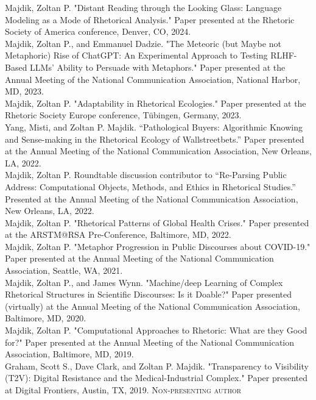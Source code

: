 \documentclass[10pt, a4paper]{article}
\newcommand{\years}[1]{\marginnote{\scriptsize #1}}
\begin{document}
\noindent
\years{2024}Majdik, Zoltan P. "Distant Reading through the Looking Glass: Language Modeling as a Mode of Rhetorical Analysis." Paper presented at the Rhetoric Society of America conference, Denver, CO, 2024.\\
\years{2023}Majdik, Zoltan P., and Emmanuel Dadzie. "The Meteoric (but Maybe not Metaphoric) Rise of ChatGPT: An Experimental Approach to Testing RLHF-Based LLMs' Ability to Persuade with Metaphors." Paper presented at the Annual Meeting of the National Communication Association, National Harbor, MD, 2023.\\
\years{2023}Majdik, Zoltan P. "Adaptability in Rhetorical Ecologies." Paper presented at the Rhetoric Society Europe conference, T{\"u}bingen, Germany, 2023.\\
\years{2022}Yang, Misti, and Zoltan P. Majdik. “Pathological Buyers: Algorithmic Knowing and Sense-making in the Rhetorical Ecology of Wallstreetbets.” Paper presented at the Annual Meeting of the National Communication Association, New Orleans, LA, 2022.\\
\years{2022}Majdik, Zoltan P. Roundtable discussion contributor to “Re-Parsing Public Address: Computational Objects, Methods, and Ethics in Rhetorical Studies.” Presented at the Annual Meeting of the National Communication Association, New Orleans, LA, 2022.\\
\years{2022}Majdik, Zoltan P. "Rhetorical Patterns of Global Health Crises." Paper presented at the ARSTM@RSA Pre-Conference, Baltimore, MD, 2022.\\
\years{2021}Majdik, Zoltan P. "Metaphor Progression in Public Discourses about COVID-19." Paper presented at the Annual Meeting of the National Communication Association, Seattle, WA, 2021.\\
\years{2020}Majdik, Zoltan P., and James Wynn. "Machine/deep Learning of Complex
Rhetorical Structures in Scientific Discourses: Is it Doable?" Paper presented
(virtually) at the Annual Meeting of the National Communication Association,
Baltimore, MD, 2020.\\
\years{2019}Majdik, Zoltan P. "Computational Approaches to Rhetoric: What are
they Good for?" Paper presented at the Annual Meeting of the National
Communication Association, Baltimore, MD, 2019.\\
\years{2019}Graham, Scott S., Dave Clark, and Zoltan P. Majdik. "Transparency
to Visibility (T2V): Digital Resistance and the Medical-Industrial Complex."
Paper presented at Digital Frontiers, Austin, TX, 2019. \textsc{Non-presenting
author}\\
\end{document}
